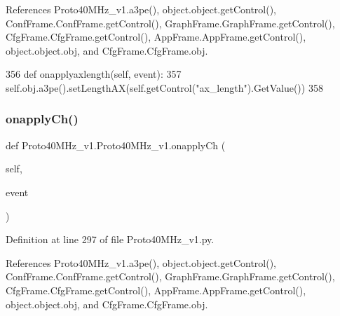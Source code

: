 References Proto40\+M\+Hz\+\_\+v1.\+a3pe(), object.\+object.\+get\+Control(), Conf\+Frame.\+Conf\+Frame.\+get\+Control(), Graph\+Frame.\+Graph\+Frame.\+get\+Control(), Cfg\+Frame.\+Cfg\+Frame.\+get\+Control(), App\+Frame.\+App\+Frame.\+get\+Control(), object.\+object.\+obj, and Cfg\+Frame.\+Cfg\+Frame.\+obj.


\begin{DoxyCode}
356     \textcolor{keyword}{def }onapplyaxlength(self, event):
357         self.obj.a3pe().setLengthAX(self.getControl(\textcolor{stringliteral}{"ax\_length"}).GetValue())
358 
\end{DoxyCode}
\mbox{\label{classProto40MHz__v1_1_1Proto40MHz__v1_a396ff2e86b0d9f7211b353aa5970bb19}} 
\subsubsection{\texorpdfstring{onapply\+Ch()}{onapplyCh()}}
{\footnotesize\ttfamily def Proto40\+M\+Hz\+\_\+v1.\+Proto40\+M\+Hz\+\_\+v1.\+onapply\+Ch (\begin{DoxyParamCaption}\item[{}]{self,  }\item[{}]{event }\end{DoxyParamCaption})}



Definition at line 297 of file Proto40\+M\+Hz\+\_\+v1.\+py.



References Proto40\+M\+Hz\+\_\+v1.\+a3pe(), object.\+object.\+get\+Control(), Conf\+Frame.\+Conf\+Frame.\+get\+Control(), Graph\+Frame.\+Graph\+Frame.\+get\+Control(), Cfg\+Frame.\+Cfg\+Frame.\+get\+Control(), App\+Frame.\+App\+Frame.\+get\+Control(), object.\+object.\+obj, and Cfg\+Frame.\+Cfg\+Frame.\+obj.


